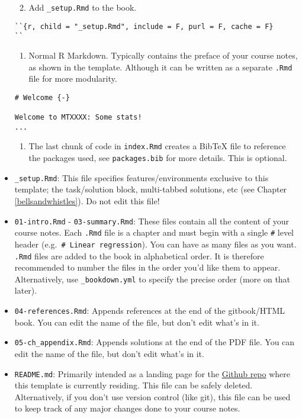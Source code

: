\documentclass[
  oneside]{krantz}
\providecommand{\tightlist}{%
  \setlength{\itemsep}{0pt}\setlength{\parskip}{0pt}}
\theoremstyle{definition}
\theoremstyle{definition}
\theoremstyle{definition}
\theoremstyle{remark}
\begin{document}
\begin{itemize}
  \begin{enumerate}
  \def\labelenumi{\arabic{enumi}.}
  \setcounter{enumi}{2}
  \tightlist
  \item
    Add \texttt{\_setup.Rmd} to the book.
  \end{enumerate}

\begin{verbatim}
``{r, child = "_setup.Rmd", include = F, purl = F, cache = F}
``
\end{verbatim}

  \begin{enumerate}
  \def\labelenumi{\arabic{enumi}.}
  \setcounter{enumi}{3}
  \tightlist
  \item
    Normal R Markdown. Typically contains the preface of your course notes, as shown in the template.
    Although it can be written as a separate \texttt{.Rmd} file for more modularity.
  \end{enumerate}

\begin{verbatim}
# Welcome {-}

Welcome to MTXXXX: Some stats!
...
\end{verbatim}

  \begin{enumerate}
  \def\labelenumi{\arabic{enumi}.}
  \setcounter{enumi}{4}
  \tightlist
  \item
    The last chunk of code in \texttt{index.Rmd} creates a BibTeX file to reference the packages used, see \texttt{packages.bib} for more details. This is optional.
  \end{enumerate}
\item
  \texttt{\_setup.Rmd}: This file specifies features/environments exclusive to this template; the task/solution block, multi-tabbed solutions, etc (see Chapter \ref{bellsandwhistles}).
  Do not edit this file!
\item
  \texttt{01-intro.Rmd} - \texttt{03-summary.Rmd}: These files contain all the content of your course notes. Each \texttt{.Rmd} file is a chapter and must begin with a single \texttt{\#} level header (e.g.~\texttt{\#\ Linear\ regression}). You can have as many files as you want. \texttt{.Rmd} files are added to the book in alphabetical order. It is therefore recommended to number the files in the order you'd like them to appear. Alternatively, use \texttt{\_bookdown.yml} to specify the precise order (more on that later).
\item
  \texttt{04-references.Rmd}: Appends references at the end of the gitbook/HTML book. You can edit the name of the file, but don't edit what's in it.
\item
  \texttt{05-ch\_appendix.Rmd}: Appends solutions at the end of the PDF file. You can edit the name of the file, but don't edit what's in it.
\item
  \texttt{README.md}: Primarily intended as a landing page for the \href{https://github.com/lindesaysh/StAndrewsTemplateBookdown}{Github repo} where this template is currently residing. This file can be safely deleted. Alternatively, if you don't use version control (like git), this file can be used to keep track of any major changes done to your course notes.
\end{itemize}
\end{document}
